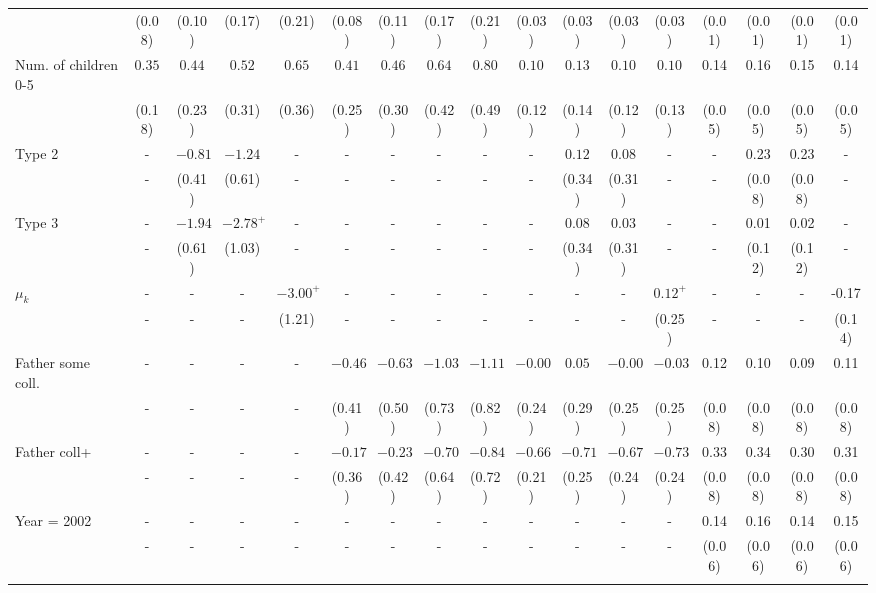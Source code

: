 \begin{tabular}{lcccccccccccccccc}
&(0.08)&(0.10)&(0.17)&(0.21)&(0.08)&(0.11)&(0.17)&(0.21)&(0.03)&(0.03)&(0.03)&(0.03)&(0.01)&(0.01)&(0.01)&(0.01)\\
Num. of children 0-5&$0.35$&$0.44$&$0.52$&$0.65$&$0.41$&$0.46$&$0.64$&$0.80$&$0.10$&$0.13$&$0.10$&$0.10$&0.14&0.16&0.15&0.14\\
&(0.18)&(0.23)&(0.31)&(0.36)&(0.25)&(0.30)&(0.42)&(0.49)&(0.12)&(0.14)&(0.12)&(0.13)&(0.05)&(0.05)&(0.05)&(0.05)\\
Type 2&-&$-0.81$&$-1.24$&-&-&-&-&-&-&$0.12$&$0.08$&-&-&0.23&0.23&-\\
&-&(0.41)&(0.61)&-&-&-&-&-&-&(0.34)&(0.31)&-&-&(0.08)&(0.08)&-\\
Type 3&-&$-1.94$&$-2.78^{+}$&-&-&-&-&-&-&$0.08$&$0.03$&-&-&0.01&0.02&-\\
&-&(0.61)&(1.03)&-&-&-&-&-&-&(0.34)&(0.31)&-&-&(0.12)&(0.12)&-\\
$\mu_{k}$&-&-&-&$-3.00^{+}$&-&-&-&-&-&-&-&$0.12^{+}$&-&-&-&-0.17\\
&-&-&-&(1.21)&-&-&-&-&-&-&-&(0.25)&-&-&-&(0.14)\\
Father some coll.&-&-&-&-&$-0.46$&$-0.63$&$-1.03$&$-1.11$&$-0.00$&$0.05$&$-0.00$&$-0.03$&0.12&0.10&0.09&0.11\\
&-&-&-&-&(0.41)&(0.50)&(0.73)&(0.82)&(0.24)&(0.29)&(0.25)&(0.25)&(0.08)&(0.08)&(0.08)&(0.08)\\
Father coll+&-&-&-&-&$-0.17$&$-0.23$&$-0.70$&$-0.84$&$-0.66$&$-0.71$&$-0.67$&$-0.73$&0.33&0.34&0.30&0.31\\
&-&-&-&-&(0.36)&(0.42)&(0.64)&(0.72)&(0.21)&(0.25)&(0.24)&(0.24)&(0.08)&(0.08)&(0.08)&(0.08)\\
Year = 2002&-&-&-&-&-&-&-&-&-&-&-&-&0.14&0.16&0.14&0.15\\
&-&-&-&-&-&-&-&-&-&-&-&-&(0.06)&(0.06)&(0.06)&(0.06)\\
\\
\bottomrule\end{tabular}
